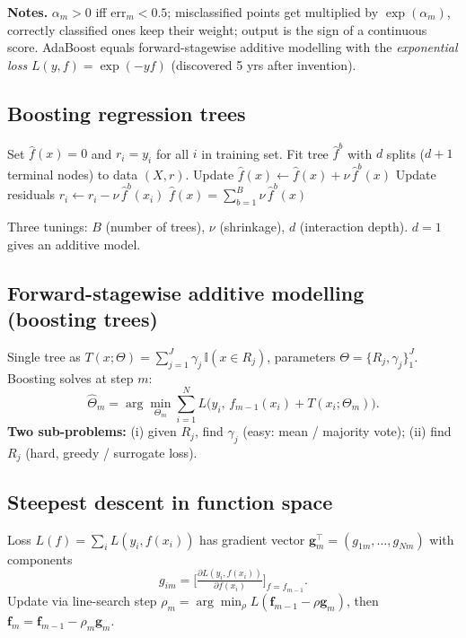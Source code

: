 \textbf{Notes.} $\alpha_m>0$ iff $\text{err}_m<0.5$; misclassified points get multiplied by $\exp(\alpha_m)$, correctly classified ones keep their weight; output is the sign of a continuous score. AdaBoost equals forward-stagewise additive modelling with the \emph{exponential loss} $L(y,f)=\exp(-yf)$ (discovered 5 yrs after invention).

\subsection{Boosting regression trees}
\begin{algorithm}[H]
\caption{Boosting for regression trees}
\begin{algorithmic}
\State Set $\hat f(x)=0$ and $r_i=y_i$ for all $i$ in training set.
  \State Fit tree $\hat f^{b}$ with $d$ splits ($d{+}1$ terminal nodes) to data $(X,r)$.
  \State Update $\hat f(x) \gets \hat f(x) + \nu\, \hat f^{b}(x)$
  \State Update residuals $r_i \gets r_i - \nu\, \hat f^{b}(x_i)$
\EndFor
\State \Return $\hat f(x) = \sum_{b=1}^B \nu\, \hat f^{b}(x)$
\end{algorithmic}
\end{algorithm}
Three tunings: $B$ (number of trees), $\nu$ (shrinkage), $d$ (interaction depth). $d=1$ gives an additive model.

\subsection{Forward-stagewise additive modelling (boosting trees)}
Single tree as $T(x;\Theta)=\sum_{j=1}^J \gamma_j\, \mathbb{I}(x\in R_j)$, parameters $\Theta=\{R_j,\gamma_j\}_1^J$. Boosting solves at step $m$:
\[ \hat\Theta_m = \arg\min_{\Theta_m} \sum_{i=1}^N L\!\big(y_i,\, f_{m-1}(x_i) + T(x_i;\Theta_m)\big). \]
\textbf{Two sub-problems:} (i) given $R_j$, find $\gamma_j$ (easy: mean / majority vote); (ii) find $R_j$ (hard, greedy / surrogate loss).

\subsection{Steepest descent in function space}
Loss $L(f)=\sum_i L(y_i,f(x_i))$ has gradient vector $\mathbf{g}_m^\top=(g_{1m},\dots,g_{Nm})$ with components
\[ g_{im}=\Big[\tfrac{\partial L(y_i,f(x_i))}{\partial f(x_i)}\Big]_{f=f_{m-1}}. \]
Update via line-search step $\rho_m = \arg\min_\rho L(\mathbf{f}_{m-1}-\rho\mathbf{g}_m)$, then $\mathbf{f}_m = \mathbf{f}_{m-1} - \rho_m \mathbf{g}_m$.

